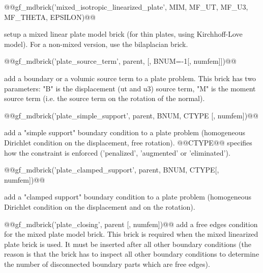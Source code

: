\documentclass[11pt,a4paper]{article}
\newcommand{\newpage}{}
\begin{document}
\begin{cmddescription}
@@gf_mdbrick('mixed_isotropic_linearized_plate', MIM, MF_UT, MF_U3, MF_THETA, EPSILON)@@

setup a mixed linear plate model brick (for thin plates, using
Kirchhoff-Love model).  For a non-mixed version, use the bilaplacian
brick.

@@gf_mdbrick('plate_source_term', parent, [, BNUM=-1[, numfem]])@@

add a boundary or a volumic source term to a plate problem. This brick
has two parameters: "B" is the displacement (ut and u3) source term,
"M" is the moment source term (i.e. the source term on the rotation of
the normal).

@@gf_mdbrick('plate_simple_support', parent, BNUM, CTYPE [, numfem])@@

add a "simple support" boundary condition to a plate problem (homogeneous
Dirichlet condition on the displacement, free rotation). @@CTYPE@@ specifies how
the constraint is enforced ('penalized', 'augmented' or 'eliminated').


@@gf_mdbrick('plate_clamped_support', parent, BNUM, CTYPE[, numfem])@@

add a "clamped support" boundary condition to a plate problem
(homogeneous Dirichlet condition on the displacement and on the
rotation).

@@gf_mdbrick('plate_closing', parent [, numfem])@@
add a free edges condition for the mixed plate model brick.  This brick is
required when the mixed linearized plate brick is used. It must be inserted
after all other boundary conditions (the reason is that the brick has to
inspect all other boundary conditions to determine the number of disconnected
boundary parts which are free edges).

\end{cmddescription}
\newpage

\end{document}
